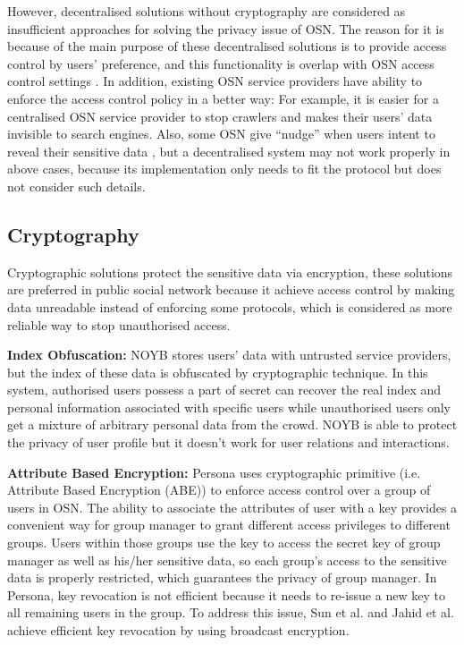 However, decentralised solutions without cryptography are considered as insufficient approaches for solving the privacy issue of OSN. The reason for it is because of the main purpose of these decentralised solutions is to provide access control by users' preference, and this functionality is overlap with OSN access control settings \cite{narayanan2012critical}. In addition, existing OSN service providers have ability to enforce the access control policy in a better way: For example, it is easier for a centralised OSN service provider to stop crawlers and makes their users' data invisible to search engines. Also, some OSN give ``nudge''  when users intent to reveal their sensitive data \cite{mori2010nudge}, but a decentralised system may not work properly in above cases, because its implementation only needs to fit the protocol but does not consider such details.

\subsection{Cryptography}
Cryptographic solutions protect the sensitive data via encryption, these solutions are preferred in public social network because it achieve access control by making data unreadable instead of enforcing some protocols, which is considered as more reliable way to stop unauthorised access.

{\bf Index Obfuscation:} NOYB \cite{guha2008noyb} stores users' data with untrusted service providers, but the index of these data is obfuscated by cryptographic technique. In this system, authorised users possess a part of secret can recover the real index and personal information associated with specific users while unauthorised users only get a mixture of arbitrary personal data from the crowd. NOYB is able to protect the privacy of user profile but it doesn't work for user relations and interactions. 

{\bf Attribute Based Encryption:} Persona \cite{baden2009persona} uses cryptographic primitive (i.e. Attribute Based Encryption (ABE)) to enforce access control over a group of users in OSN. The ability to associate the attributes of user with a key provides a convenient way for group manager to grant different access privileges to different groups. Users within those groups use the key to access the secret key of group manager as well as his/her sensitive data, so each group's access to the sensitive data is properly restricted, which guarantees the privacy of group manager. In Persona, key revocation is not efficient because it needs to re-issue a new key to all remaining users in the group. To address this issue, Sun et al. \cite{sun2010privacy} and Jahid et al. \cite{jahid2011easier} achieve efficient key revocation by using broadcast encryption.

